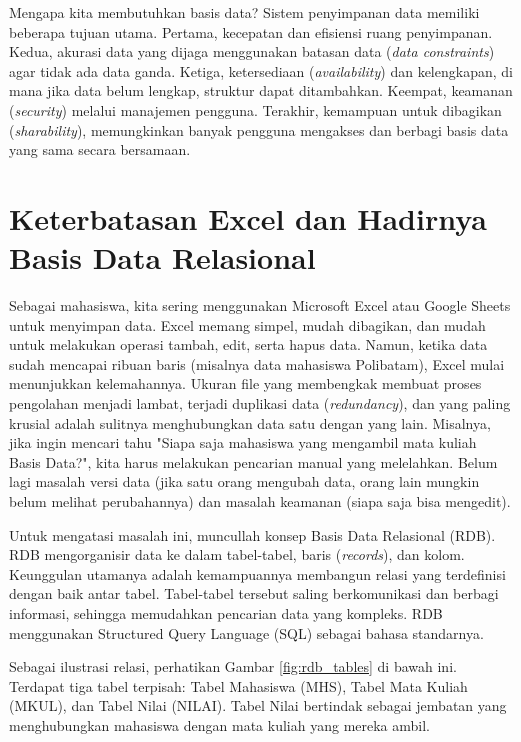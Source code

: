 \documentclass[11pt,a4paper]{article}
\begin{document}
Mengapa kita membutuhkan basis data? Sistem penyimpanan data memiliki beberapa tujuan utama. Pertama, kecepatan dan efisiensi ruang penyimpanan. Kedua, akurasi data yang dijaga menggunakan batasan data (\textit{data constraints}) agar tidak ada data ganda. Ketiga, ketersediaan (\textit{availability}) dan kelengkapan, di mana jika data belum lengkap, struktur dapat ditambahkan. Keempat, keamanan (\textit{security}) melalui manajemen pengguna. Terakhir, kemampuan untuk dibagikan (\textit{sharability}), memungkinkan banyak pengguna mengakses dan berbagi basis data yang sama secara bersamaan.

\section{Keterbatasan Excel dan Hadirnya Basis Data Relasional}

Sebagai mahasiswa, kita sering menggunakan Microsoft Excel atau Google Sheets untuk menyimpan data. Excel memang simpel, mudah dibagikan, dan mudah untuk melakukan operasi tambah, edit, serta hapus data. Namun, ketika data sudah mencapai ribuan baris (misalnya data mahasiswa Polibatam), Excel mulai menunjukkan kelemahannya. Ukuran file yang membengkak membuat proses pengolahan menjadi lambat, terjadi duplikasi data (\textit{redundancy}), dan yang paling krusial adalah sulitnya menghubungkan data satu dengan yang lain. Misalnya, jika ingin mencari tahu "Siapa saja mahasiswa yang mengambil mata kuliah Basis Data?", kita harus melakukan pencarian manual yang melelahkan. Belum lagi masalah versi data (jika satu orang mengubah data, orang lain mungkin belum melihat perubahannya) dan masalah keamanan (siapa saja bisa mengedit).

Untuk mengatasi masalah ini, muncullah konsep Basis Data Relasional (RDB). RDB mengorganisir data ke dalam tabel-tabel, baris (\textit{records}), dan kolom. Keunggulan utamanya adalah kemampuannya membangun relasi yang terdefinisi dengan baik antar tabel. Tabel-tabel tersebut saling berkomunikasi dan berbagi informasi, sehingga memudahkan pencarian data yang kompleks. RDB menggunakan Structured Query Language (SQL) sebagai bahasa standarnya.

Sebagai ilustrasi relasi, perhatikan Gambar \ref{fig:rdb_tables} di bawah ini. Terdapat tiga tabel terpisah: Tabel Mahasiswa (MHS), Tabel Mata Kuliah (MKUL), dan Tabel Nilai (NILAI). Tabel Nilai bertindak sebagai jembatan yang menghubungkan mahasiswa dengan mata kuliah yang mereka ambil.
\end{document}
